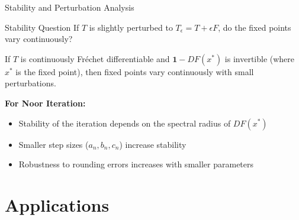 \documentclass[aspectratio=169,10pt]{beamer}
\begin{document}
\begin{frame}{Stability and Perturbation Analysis}

\begin{block}{Stability Question}
If $T$ is slightly perturbed to $T_\epsilon = T + \epsilon F$, do the fixed points vary continuously?
\end{block}

\vspace{0.3cm}

\begin{theorem}
If $T$ is continuously Fréchet differentiable and $\mathbf{1} - DF(x^*)$ is invertible (where $x^*$ is the fixed point), then fixed points vary continuously with small perturbations.
\end{theorem}

\vspace{0.3cm}

\textbf{For Noor Iteration:}
\begin{itemize}
  \item Stability of the iteration depends on the spectral radius of $DF(x^*)$
  \item Smaller step sizes ($a_n, b_n, c_n$) increase stability
  \item Robustness to rounding errors increases with smaller parameters
\end{itemize}

\end{frame}


\section{Applications}
\end{document}
